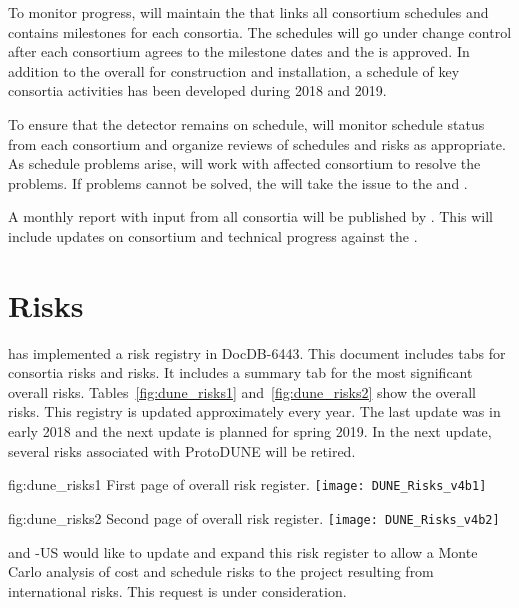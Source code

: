 To monitor progress,  will maintain the  that
links all consortium schedules and contains milestones for each
consortia.  The schedules will go under change control after each
consortium agrees to the milestone dates and the  is
approved.  In addition to the overall  for construction and
installation, a schedule of key consortia activities has been
developed during 2018 and 2019.

To ensure that the  detector remains on schedule,
 will monitor schedule status from each consortium and organize
reviews of schedules and risks as appropriate.  As schedule problems
arise,  will work with affected consortium to resolve the
problems. If problems cannot be solved, the  will take the issue to the
 and .

A monthly report with input from all consortia will be published by
. This will include updates on consortium and 
technical progress against the .

\section{Risks}
\label{sec:fdsp-coord-risks}

 has implemented a risk registry in DocDB-6443. This
document includes tabs for consortia risks and  risks. It
includes a summary tab for the most significant overall 
risks. Tables~\ref{fig:dune_risks1} and~\ref{fig:dune_risks2} show the
overall  risks. This registry is updated approximately
every year. The last update was in early 2018 and the next update is
planned for spring 2019. In the next update, several risks associated
with ProtoDUNE will be retired.
\begin{dunefigure}{fig:dune_risks1}
  {First page of  overall risk register.}
  \texttt{[image: DUNE\_Risks\_v4b1]}
\end{dunefigure}
\begin{dunefigure}{fig:dune_risks2}
  {Second page of  overall risk register.}
  \texttt{[image: DUNE\_Risks\_v4b2]}
\end{dunefigure}
 and -US would like  to update and
expand this risk register to allow a Monte Carlo analysis of cost and
schedule risks to the  project resulting from international
 risks. This request is under consideration.

